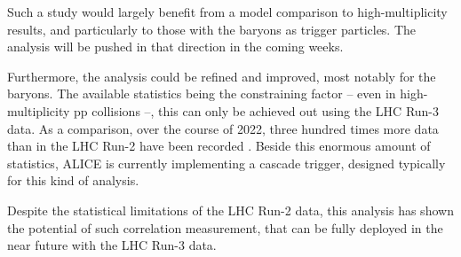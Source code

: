 %

Such a study would largely benefit from a model comparison to high-multiplicity results, and particularly to those with the \rmOmegaPM baryons as trigger particles. The analysis will be pushed in that direction in the coming weeks.

Furthermore, the analysis could be refined and improved, most notably for the \rmOmegaPM baryons. The available statistics being the constraining factor -- even in high-multiplicity pp collisions --, this can only be achieved out using the LHC Run-3 data. As a comparison, over the course of 2022, three hundred times more data than in the LHC Run-2 have been recorded \cite{cern152ndLHCCMeeting2022}. Beside this enormous amount of statistics, ALICE is currently implementing a cascade trigger, designed typically for this kind of analysis.


Despite the statistical limitations of the LHC Run-2 data, this analysis has shown the potential of such correlation measurement, that can be fully deployed in the near future with the LHC Run-3 data.

